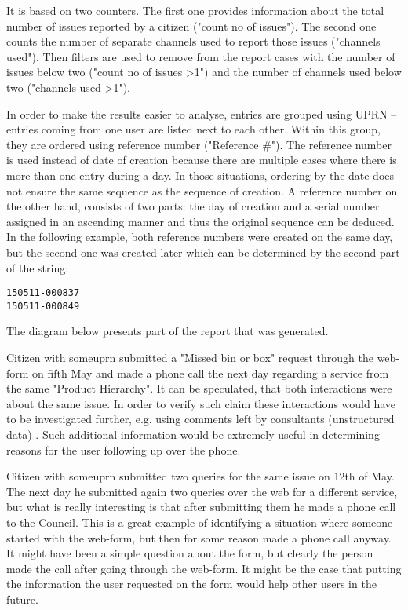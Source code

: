It is based on two counters. The first one provides information about the total number of issues reported by a citizen ("count no of issues"). The second one counts the number of separate channels used to report those issues ("channels used"). Then filters are used to remove from the report cases with the number of issues below two ("count no of issues \textgreater 1") and the number of channels used below two ("channels used \textgreater 1").

In order to make the results easier to analyse, entries are grouped using UPRN – entries coming from one user are listed next to each other. Within this group, they are ordered using reference number ("Reference \#"). The reference number is used instead of date of creation because there are multiple cases where there is more than one entry during a day. In those situations, ordering by the date does not ensure the same sequence as the sequence of creation. A reference number on the other hand, consists of two parts: the day of creation and a serial number assigned in an ascending manner and thus the original sequence can be deduced. In the following example, both reference numbers were created on the same day, but the second one was created later which can be determined by the second part of the string:
\begin{lstlisting}
150511-000837
150511-000849
\end{lstlisting}

The diagram below presents part of the report that was generated.

Citizen with some\textunderscore uprn submitted a "Missed bin or box" request through the web-form on fifth May and made a phone call the next day regarding a service from the same "Product Hierarchy". It can be speculated, that both interactions were about the same issue. In order to verify such claim these interactions would have to be investigated further, e.g. using comments left by consultants (unstructured data) \citep{baars2008management}. Such additional information would be extremely useful in determining reasons for the user following up over the phone.

Citizen with some\textunderscore uprn submitted two queries for the same issue on 12th of May. The next day he submitted again two queries over the web for a different service, but what is really interesting is that after submitting them he made a phone call to the Council. This is a great example of identifying a situation where someone started with the web-form, but then for some reason made a phone call anyway. It might have been a simple question about the form, but clearly the person made the call after going through the web-form. It might be the case that putting the information the user requested on the form would help other users in the future.
		
